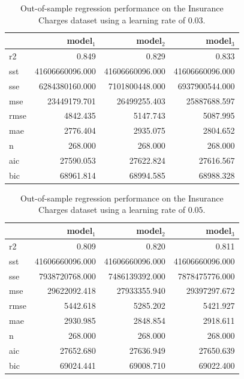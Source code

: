 \documentclass[11pt]{article}
\begin{document}
\begin{table}[H]
\centering
\caption{Out-of-sample regression performance on the Insurance Charges dataset using a learning rate of $0.03$.}
\label{tab:Auto_MPG_(In-Sample)}
\begin{tabular}{lrrr}
\toprule
 & model$_1$ & model$_2$ & model$_3$ \\
\midrule
r2 & 0.849 & 0.829 & 0.833 \\
sst & 41606660096.000 & 41606660096.000 & 41606660096.000 \\
sse & 6284380160.000 & 7101800448.000 & 6937900544.000 \\
mse & 23449179.701 & 26499255.403 & 25887688.597 \\
rmse & 4842.435 & 5147.743 & 5087.995 \\
mae & 2776.404 & 2935.075 & 2804.652 \\
n & 268.000 & 268.000 & 268.000 \\
aic & 27590.053 & 27622.824 & 27616.567 \\
bic & 68961.814 & 68994.585 & 68988.328 \\
\bottomrule
\end{tabular}
\end{table}


\begin{table}[H]
\centering
\caption{Out-of-sample regression performance on the Insurance Charges dataset using a learning rate of $0.05$.}
\label{tab:Auto_MPG_(In-Sample)}

\begin{tabular}{lrrr}
\toprule
 & model$_1$ & model$_2$ & model$_3$ \\
\midrule
r2 & 0.809 & 0.820 & 0.811 \\
sst & 41606660096.000 & 41606660096.000 & 41606660096.000 \\
sse & 7938720768.000 & 7486139392.000 & 7878475776.000 \\
mse & 29622092.418 & 27933355.940 & 29397297.672 \\
rmse & 5442.618 & 5285.202 & 5421.927 \\
mae & 2930.985 & 2848.854 & 2918.611 \\
n & 268.000 & 268.000 & 268.000 \\
aic & 27652.680 & 27636.949 & 27650.639 \\
bic & 69024.441 & 69008.710 & 69022.400 \\
\bottomrule
\end{tabular}
\end{table}
\end{document}
